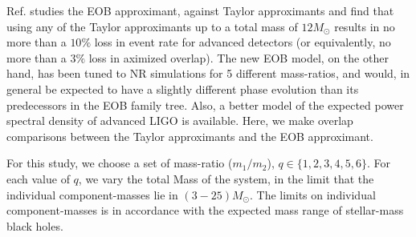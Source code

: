 \documentclass[aps,
prd,
amsmath,
amssymb,
twocolumn,
floatfix,
groupedaddress]{revtex4-1}
\begin{document}
Ref.\cite{CompTemplates2009} studies the EOB approximant, against Taylor approximants and find that using any of the Taylor approximants up to a total mass of $12M_{\odot}$ results in no more than a $10\%$ loss in event rate for advanced detectors (or equivalently, no more than a $3\%$ loss in aximized overlap). The new EOB model\citep{BuonannoEOBv2Main}, on the other hand, has been tuned to NR simulations for 5 different mass-ratios, and would, in general be expected to have a slightly different phase evolution than its predecessors in the EOB family tree. Also, a better model of the expected power spectral density of advanced LIGO is available. Here, we make overlap comparisons between the Taylor approximants and the EOB approximant.

For this study, we choose a set of mass-ratio ($m_1/m_2$), $q \in\{1,2,3,4,5,6\}$. For each value of $q$, we vary the total Mass of the system, in the limit that the individual component-masses lie in $(3-25)M_{\odot}$. The limits on individual component-masses is in accordance with the expected mass range of stellar-mass black holes.
\end{document}
